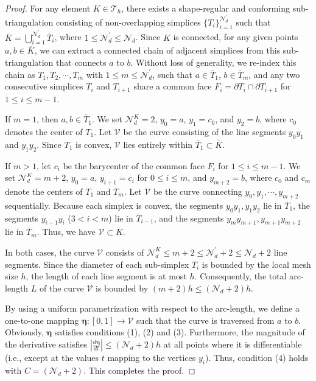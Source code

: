 \documentclass[1996/10/24]{amsart}
\theoremstyle{definition}
\numberwithin{equation}{section}
\begin{document}
\begin{proof}
For any element $K\in\mathcal{T}_{h}$, there exists a shape-regular and conforming sub-triangulation consisting of non-overlapping simplices $\{ T_{i}\}_{i=1}^{\mathcal{N}_{d}^{\prime}}$ such that $\overline{K} = \bigcup_{i=1}^{\mathcal{N}_{d}^{\prime}} \overline{T}_{i}$, where $1 \leq \mathcal{N}_{d}^{\prime} \leq \mathcal{N}_{d}$.
Since $K$ is connected, for any given points $a,b\in \overline{K}$, we can extract a connected chain of adjacent simplices from this sub-triangulation that connects $a$ to $b$. Without loss of generality, we re-index this chain as $T_1, T_2, \cdots, T_m$ with $1 \leq m \leq \mathcal{N}_{d}^{\prime}$, such that $a\in \overline{T}_{1}$, $b\in \overline{T}_{m}$, and any two consecutive simplices $T_i$ and $T_{i+1}$ share a common face $F_{i}= \partial T_{i} \cap \partial T_{i+1}$ for $1\leq i \leq m - 1$.

If $m=1$, then $a, b \in \overline{T}_1$. We set $\mathcal{N}_d^K = 2$, $y_0 = a$, $y_1=c_0$, and $y_2 = b$, where $c_0$ denotes the center of $T_1$. Let $\mathcal{V}$ be the curve consisting of the line segments $y_0y_1$ and $y_1y_2$. Since $T_1$ is convex, $\mathcal{V}$ lies entirely within $\overline{T}_1 \subset \overline{K}$.

If $m>1$, let $c_{i}$ be the barycenter of the common face $F_{i}$ for $1\leq i \leq m - 1$. We set $\mathcal{N}_d^K = m+2$, $y_0 = a$, $y_{i+1} = c_i$ for $0 \leq i \leq m$, and $y_{m+2} = b$, where $c_0$ and $c_m$ denote the centers of $T_1$ and $T_{m}$. Let $\mathcal{V}$ be the curve connecting $y_0, y_1, \cdots, y_{m+2}$ sequentially.
Because each simplex is convex, the segments $y_0y_1, y_1y_2$ lie in $\overline{T}_1$, the segments $y_{i-1}y_i$ ($3 < i < m$) lie in $\overline{T}_{i-1}$, and the segments $y_{m}y_{m+1}, y_{m+1}y_{m+2}$ lie in $\overline{T}_m$. Thus, we have $\mathcal{V} \subset \overline{K}$.

In both cases, the curve $\mathcal{V}$ consists of $\mathcal{N}_d^K \leq m+2 \leq \mathcal{N}_d^{\prime}+2 \leq \mathcal{N}_d+2$ line segments.
Since the diameter of each sub-simplex $T_i$ is bounded by the local mesh size $h$, the length of each line segment is at most $h$.
Consequently, the total arc-length $L$ of the curve $\mathcal{V}$ is bounded by $(m+2) h \leq (\mathcal{N}_d+2) h$.

By using a uniform parametrization with respect to the arc-length, we define a one-to-one mapping $\boldsymbol{\eta}: [0,1] \rightarrow \mathcal{V}$ such that the curve is traversed from $a$ to $b$.
Obviously, $\boldsymbol{\eta}$ satisfies conditions (1), (2) and (3).
Furthermore, the magnitude of the derivative satisfies $\left|\frac{d\boldsymbol{\eta}}{dt}\right| \leq (\mathcal{N}_d+2) h$ at all points where it is differentiable (i.e., except at the values $t$ mapping to the vertices $y_i$). Thus, condition (4) holds with $C = (\mathcal{N}_d+2)$.
This completes the proof.
\end{proof}
\end{document}

